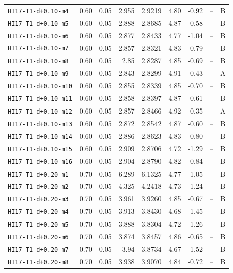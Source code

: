 \begin{longtable}{@{}lrrrrrrrc@{}}
\texttt{HI17-T1-d+0.10-m4} & 0.60 & 0.05 & 2.955 & 2.9219 & 4.80 & -0.92 & -- & B\\
\texttt{HI17-T1-d+0.10-m5} & 0.60 & 0.05 & 2.888 & 2.8685 & 4.87 & -0.58 & -- & B\\
\texttt{HI17-T1-d+0.10-m6} & 0.60 & 0.05 & 2.877 & 2.8433 & 4.77 & -1.04 & -- & B\\
\texttt{HI17-T1-d+0.10-m7} & 0.60 & 0.05 & 2.857 & 2.8321 & 4.83 & -0.79 & -- & B\\
\texttt{HI17-T1-d+0.10-m8} & 0.60 & 0.05 & 2.85 & 2.8287 & 4.85 & -0.69 & -- & B\\
\texttt{HI17-T1-d+0.10-m9} & 0.60 & 0.05 & 2.843 & 2.8299 & 4.91 & -0.43 & -- & A\\
\texttt{HI17-T1-d+0.10-m10} & 0.60 & 0.05 & 2.855 & 2.8339 & 4.85 & -0.70 & -- & B\\
\texttt{HI17-T1-d+0.10-m11} & 0.60 & 0.05 & 2.858 & 2.8397 & 4.87 & -0.61 & -- & B\\
\texttt{HI17-T1-d+0.10-m12} & 0.60 & 0.05 & 2.857 & 2.8466 & 4.92 & -0.35 & -- & A\\
\texttt{HI17-T1-d+0.10-m13} & 0.60 & 0.05 & 2.872 & 2.8542 & 4.87 & -0.60 & -- & B\\
\texttt{HI17-T1-d+0.10-m14} & 0.60 & 0.05 & 2.886 & 2.8623 & 4.83 & -0.80 & -- & B\\
\texttt{HI17-T1-d+0.10-m15} & 0.60 & 0.05 & 2.909 & 2.8706 & 4.72 & -1.29 & -- & B\\
\texttt{HI17-T1-d+0.10-m16} & 0.60 & 0.05 & 2.904 & 2.8790 & 4.82 & -0.84 & -- & B\\
\texttt{HI17-T1-d+0.20-m1} & 0.70 & 0.05 & 6.289 & 6.1325 & 4.77 & -1.05 & -- & B\\
\texttt{HI17-T1-d+0.20-m2} & 0.70 & 0.05 & 4.325 & 4.2418 & 4.73 & -1.24 & -- & B\\
\texttt{HI17-T1-d+0.20-m3} & 0.70 & 0.05 & 3.961 & 3.9260 & 4.85 & -0.67 & -- & B\\
\texttt{HI17-T1-d+0.20-m4} & 0.70 & 0.05 & 3.913 & 3.8430 & 4.68 & -1.45 & -- & B\\
\texttt{HI17-T1-d+0.20-m5} & 0.70 & 0.05 & 3.888 & 3.8304 & 4.72 & -1.26 & -- & B\\
\texttt{HI17-T1-d+0.20-m6} & 0.70 & 0.05 & 3.874 & 3.8457 & 4.86 & -0.65 & -- & B\\
\texttt{HI17-T1-d+0.20-m7} & 0.70 & 0.05 & 3.94 & 3.8734 & 4.67 & -1.52 & -- & B\\
\texttt{HI17-T1-d+0.20-m8} & 0.70 & 0.05 & 3.938 & 3.9070 & 4.84 & -0.72 & -- & B\\

\end{longtable}

